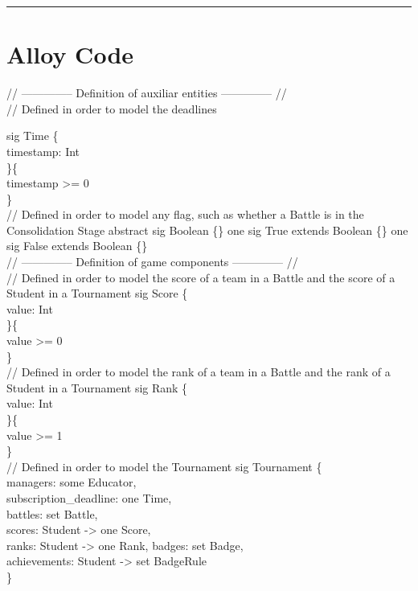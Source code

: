 \documentclass{Configuration_Files/Template}
\begin{document}
{\color{bluepoli}\rule{\linewidth}{0.1pt}}

\section{Alloy Code}

// -------------- Definition of auxiliar entities -------------- //\\

// Defined in order to model the deadlines

sig Time \{\\
timestamp: Int\\
\}\{\\
timestamp >= 0\\
\}\\

// Defined in order to model any flag, such as whether a Battle is in the Consolidation Stage
abstract sig Boolean \{\}
one sig True extends Boolean \{\}
one sig False extends Boolean \{\}\\

// -------------- Definition of game components -------------- //\\

// Defined in order to model the score of a team in a Battle and the score of a Student in a Tournament
sig Score \{\\
value: Int\\
\}\{\\
value >= 0\\
\}\\

// Defined in order to model the rank of a team in a Battle and the rank of a Student in a Tournament
sig Rank \{\\
value: Int\\
\}\{\\
value >= 1\\
\}\\

// Defined in order to model the Tournament
sig Tournament \{\\
managers: some Educator,\\
subscription\_deadline: one Time,\\
battles: set Battle,\\
scores: Student -> one Score,\\
ranks: Student -> one Rank,
badges: set Badge,\\
achievements: Student -> set BadgeRule\\
\}\\
\end{document}
